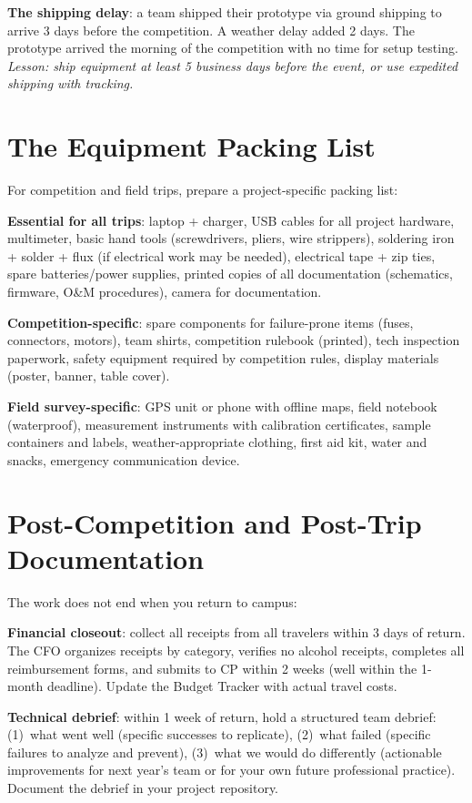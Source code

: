 \textbf{The shipping delay}: a team shipped their prototype via ground shipping to arrive 3 days before the competition. A weather delay added 2 days. The prototype arrived the morning of the competition with no time for setup testing. \emph{Lesson: ship equipment at least 5 business days before the event, or use expedited shipping with tracking.}

\section{The Equipment Packing List}
For competition and field trips, prepare a project-specific packing list:

\textbf{Essential for all trips}: laptop + charger, USB cables for all project hardware, multimeter, basic hand tools (screwdrivers, pliers, wire strippers), soldering iron + solder + flux (if electrical work may be needed), electrical tape + zip ties, spare batteries/power supplies, printed copies of all documentation (schematics, firmware, O\&M procedures), camera for documentation.

\textbf{Competition-specific}: spare components for failure-prone items (fuses, connectors, motors), team shirts, competition rulebook (printed), tech inspection paperwork, safety equipment required by competition rules, display materials (poster, banner, table cover).

\textbf{Field survey-specific}: GPS unit or phone with offline maps, field notebook (waterproof), measurement instruments with calibration certificates, sample containers and labels, weather-appropriate clothing, first aid kit, water and snacks, emergency communication device.



\section{Post-Competition and Post-Trip Documentation}
The work does not end when you return to campus:

\textbf{Financial closeout}: collect all receipts from all travelers within 3 days of return. The CFO organizes receipts by category, verifies no alcohol receipts, completes all reimbursement forms, and submits to CP within 2 weeks (well within the 1-month deadline). Update the Budget Tracker with actual travel costs.

\textbf{Technical debrief}: within 1 week of return, hold a structured team debrief: (1)~what went well (specific successes to replicate), (2)~what failed (specific failures to analyze and prevent), (3)~what we would do differently (actionable improvements for next year's team or for your own future professional practice). Document the debrief in your project repository.

